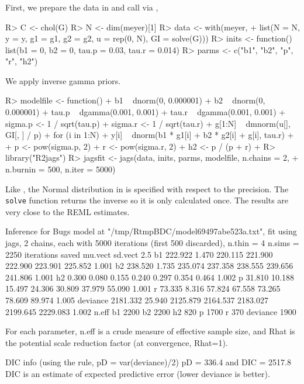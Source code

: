 \documentclass[article]{jss}
\begin{document}
\subsubsection[JAGS]{}
First, we prepare the data in  and call 
via ,
%
\begin{Schunk}
\begin{Sinput}
R> C <- chol(G)
R> N <- dim(meyer)[1]
R> data <- with(meyer,
+    list(N = N, y = y, g1 = g1, g2 = g2, u = rep(0, N), GI = solve(G)))
R> inits <- function() list(b1 = 0, b2 = 0, tau.p = 0.03, tau.r = 0.014)
R> parms <- c("b1", "b2", "p", "r", "h2")
\end{Sinput}
\end{Schunk}
%
We apply inverse gamma priors.
%
\begin{Schunk}
\begin{Sinput}
R> modelfile <- function() {
+    b1 ~ dnorm(0, 0.000001)
+    b2 ~ dnorm(0, 0.000001)
+    tau.p ~ dgamma(0.001, 0.001)
+    tau.r ~ dgamma(0.001, 0.001)
+    sigma.p <- 1 / sqrt(tau.p)
+    sigma.r <- 1 / sqrt(tau.r)
+    g[1:N] ~ dmnorm(u[], GI[, ] / p)
+    for (i in 1:N) {
+      y[i] ~ dnorm(b1 * g1[i] + b2 * g2[i] + g[i], tau.r)
+    }
+    p <- pow(sigma.p, 2)
+    r <- pow(sigma.r, 2)
+    h2 <- p / (p + r)
+  }
R> library("R2jags")
R> jagsfit <- jags(data, inits, parms, modelfile, n.chains = 2, 
+    n.burnin = 500, n.iter = 5000)
\end{Sinput}
\end{Schunk}
%
Like , the Normal distribution in  is specified 
with respect to the precision. The \verb/solve/ function returns the 
inverse so it is only calculated once. The results are very close to the REML 
estimates.
%
\begin{Schunk}
\begin{Soutput}
Inference for Bugs model at "/tmp/RtmpBDC/model69497abe523a.txt", fit using
 jags, 2 chains, each with 5000 iterations (first 500 discarded), n.thin = 4 
 n.sims = 2250 iterations saved
          mu.vect sd.vect     2.5%
b1        222.922   1.470  220.115  221.900  222.900  223.901  225.852 1.001
b2        238.520   1.735  235.074  237.358  238.555  239.656  241.806 1.001
h2          0.300   0.080    0.155    0.240    0.297    0.354    0.464 1.002
p          31.810  10.188   15.497   24.306   30.809   37.979   55.090 1.001
r          73.335   8.316   57.824   67.558   73.265   78.609   89.974 1.005
deviance 2181.332  25.940 2125.879 2164.537 2183.027 2199.645 2229.083 1.002
         n.eff
b1        2200
b2        2200
h2         820
p         1700
r          370
deviance  1900

For each parameter, n.eff is a crude measure of effective sample size,
and Rhat is the potential scale reduction factor (at convergence, Rhat=1).

DIC info (using the rule, pD = var(deviance)/2)
pD = 336.4 and DIC = 2517.8
DIC is an estimate of expected predictive error (lower deviance is better).
\end{Soutput}
\end{Schunk}
\end{document}
